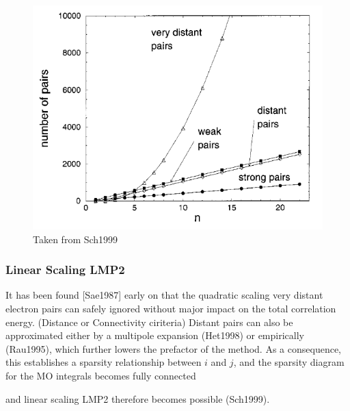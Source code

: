 \begin{figure}
\centering
\includegraphics[scale=0.5]{Pics/electron_pairs.png}
\caption{Taken from Sch1999}
\end{figure}

\subsubsection{Linear Scaling LMP2}

It has been found [Sae1987] early on that the quadratic scaling very distant electron pairs can safely ignored without major impact on the total correlation energy. (Distance or Connectivity ciriteria) Distant pairs can also be approximated either by a multipole expansion (Het1998) or empirically (Rau1995), which further lowers the prefactor of the method. As a consequence, this establishes a sparsity relationship between $i$ and $j$, and the sparsity diagram for the MO integrals becomes fully connected
\begin{center}
\end{center}
\noindent and linear scaling LMP2 therefore becomes possible (Sch1999).

